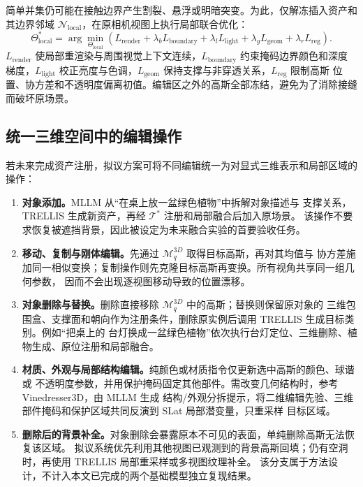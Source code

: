 简单并集仍可能在接触边界产生割裂、悬浮或明暗突变。为此，仅解冻插入资产和其边界邻域
$\mathcal N_{\mathrm{local}}$，在原相机视图上执行局部联合优化：
\begin{equation}
  \Theta_{\mathrm{local}}^{*}=\arg\min_{\Theta_{\mathrm{local}}}
  \left(L_{\mathrm{render}}+\lambda_bL_{\mathrm{boundary}}
  +\lambda_lL_{\mathrm{light}}+\lambda_gL_{\mathrm{geom}}
  +\lambda_rL_{\mathrm{reg}}\right).
\end{equation}
$L_{\mathrm{render}}$ 使局部重渲染与周围视觉上下文连续，$L_{\mathrm{boundary}}$ 约束掩码边界颜色和深度
梯度，$L_{\mathrm{light}}$ 校正亮度与色调，$L_{\mathrm{geom}}$ 保持支撑与非穿透关系，$L_{\mathrm{reg}}$ 限制高斯
位置、协方差和不透明度偏离初值。编辑区之外的高斯全部冻结，避免为了消除接缝而破坏原场景。

\subsection{统一三维空间中的编辑操作}

若未来完成资产注册，拟议方案可将不同编辑统一为对显式三维表示和局部区域的操作：

\begin{enumerate}[label=\arabic*.]
  \item \textbf{对象添加。}MLLM 从“在桌上放一盆绿色植物”中拆解对象描述与
  支撑关系，TRELLIS 生成新资产，再经 $\mathcal{T}^{*}$ 注册和局部融合后加入原场景。
  该操作不要求恢复被遮挡背景，因此被设定为未来融合实验的首要验收任务。

  \item \textbf{移动、复制与刚体编辑。}先通过 $\mathcal M_q^{3D}$ 取得目标高斯，再对其均值与
  协方差施加同一相似变换；复制操作则先克隆目标高斯再变换。所有视角共享同一组几何参数，
  因而不会出现逐视图移动导致的位置漂移。

  \item \textbf{对象删除与替换。}删除直接移除 $\mathcal M_q^{3D}$ 中的高斯；替换则保留原对象的
  三维包围盒、支撑面和朝向作为注册条件，删除原实例后调用 TRELLIS 生成目标类别。例如“把桌上的
  台灯换成一盆绿色植物”依次执行台灯定位、三维删除、植物生成、原位注册和局部融合。

  \item \textbf{材质、外观与局部结构编辑。}纯颜色或材质指令仅更新选中高斯的颜色、球谐或
  不透明度参数，并用保护掩码固定其他部件。需改变几何结构时，参考 Vinedresser3D，由 MLLM 生成
  结构/外观分拆提示，将二维编辑先验、三维部件掩码和保护区域共同反演到 SLat 局部潜变量，只重采样
  目标区域\cite{vinedresser}。

  \item \textbf{删除后的背景补全。}对象删除会暴露原本不可见的表面，单纯删除高斯无法恢复该区域。
  拟议系统优先利用其他视图已观测到的背景高斯回填；仍有空洞时，再使用 TRELLIS 局部重采样或多视图纹理补全。
  该分支属于方法设计，不计入本文已完成的两个基础模型独立复现结果。
\end{enumerate}

